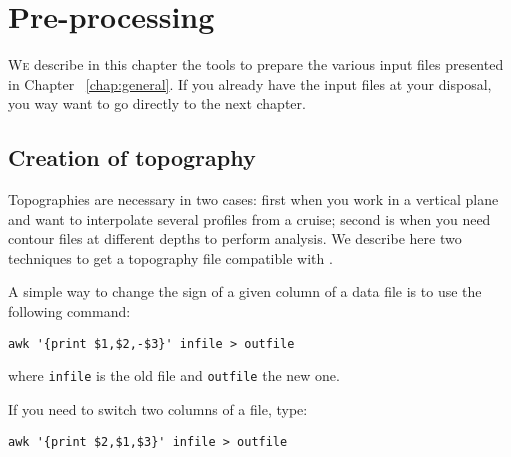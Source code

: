\chapter{Pre-processing \label{Preprocessing}}
\vspace*{-1cm}
\lettrine[lines=2, loversize=-0.1, lraise=0.1]{W}{e} describe in this chapter the tools to prepare the various input files presented in Chapter~ \ref{chap:general}. If you already have the input files at your disposal, you way want to go directly to the next chapter.

\minitoc

\section{Creation of topography\label{sec:howtotopo}}

Topographies are necessary in two cases: first when you work in a vertical plane and want to interpolate several profiles from a cruise; second is when you need contour files at different depths to perform analysis. We describe here two techniques to get a topography file compatible with \diva.


\begin{center}
\end{center}

\btips
A simple way to change the sign of a given column of a data file is to use the following command:
\begin{verbatim}
awk '{print $1,$2,-$3}' infile > outfile
\end{verbatim}
where \texttt{infile} is the old file and \texttt{outfile} the new one.

If you need to switch two columns of a file, type:
\begin{verbatim}
awk '{print $2,$1,$3}' infile > outfile
\end{verbatim}
\etips



